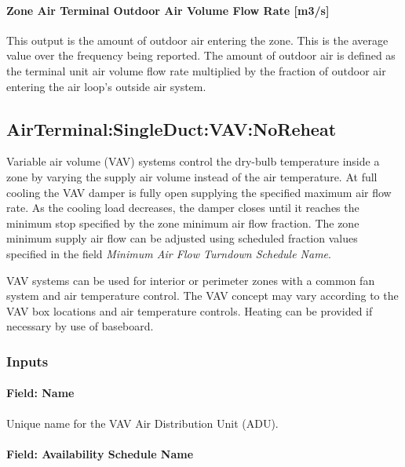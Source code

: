 \paragraph{Zone Air Terminal Outdoor Air Volume Flow Rate {[}m3/s{]}}

This output is the amount of outdoor air entering the zone. This is the average value over the frequency being reported. The amount of outdoor air is defined as the terminal unit air volume flow rate multiplied by the fraction of outdoor air entering the air loop's outside air system.

\subsection{AirTerminal:SingleDuct:VAV:NoReheat}\label{airterminalsingleductvavnoreheat}

Variable air volume (VAV) systems control the dry-bulb temperature inside a zone by varying the supply air volume instead of the air temperature. At full cooling the VAV damper is fully open supplying the specified maximum air flow rate. As the cooling load decreases, the damper closes until it reaches the minimum stop specified by the zone minimum air flow fraction. The zone minimum supply air flow can be adjusted using scheduled fraction values specified in the field \textit{Minimum Air Flow Turndown Schedule Name}.

VAV systems can be used for interior or perimeter zones with a common fan system and air temperature control. The VAV concept may vary according to the VAV box locations and air temperature controls. Heating can be provided if necessary by use of baseboard.

\subsubsection{Inputs}\label{inputs-5-000}

\paragraph{Field: Name}\label{field-name-5-000}

Unique name for the VAV Air Distribution Unit (ADU).

\paragraph{Field: Availability Schedule Name}\label{field-availability-schedule-name-5}

